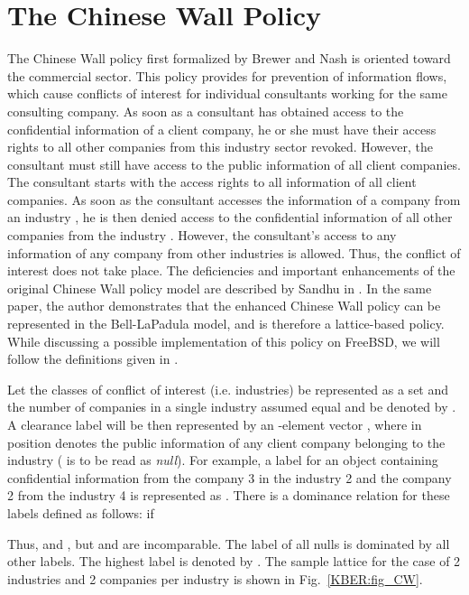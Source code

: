 \documentclass[10pt,a4paper,conference,onecolumn]{IEEEtran}
\newcommand{\KBERcode}[1]{\textsl{#1}}
\begin{document}
\section{The Chinese Wall Policy}

The Chinese Wall policy first formalized by Brewer and Nash \cite{DBLP:conf/sp/BrewerN89}
is oriented toward the commercial sector. This policy provides for prevention of
information flows, which cause conflicts of interest for individual consultants
working for the same consulting company. As soon as a consultant has obtained
access to the confidential information of a client company, he or she must 
have their access rights to all other companies from this industry sector 
revoked. However, the consultant must still have access to the public 
information of all client companies. The consultant starts with the access
rights to all information of all client companies. As soon as the consultant
accesses the information of a company  from an industry , he is then
denied access to the confidential information of all other companies from the
industry . However, the consultant's access to any information of any
company from other industries is allowed. Thus, the conflict of interest does not take 
place. The deficiencies and important enhancements of the original Chinese Wall
policy model are described by Sandhu in \cite{DBLP:journals/compsec/Sandhu92}. In the same paper,
the author demonstrates that the enhanced Chinese Wall policy can be 
represented in the Bell-LaPadula model, and is therefore a lattice-based
policy. While discussing a possible implementation of this policy on FreeBSD,
we will follow the definitions given in \cite{DBLP:journals/computer/Sandhu93}.

Let the classes of conflict of interest (i.e. industries) be represented 
as a set  and the number of 
companies in a single industry assumed equal and be denoted by . 
A clearance label will be then represented by an -element vector 
, 
where  in position  denotes the public information of any client company 
belonging to the industry  ( is to be read as \KBERcode{null}). For example, a label for an object containing
confidential information from the company 3 in the industry 2 and the company 2 from 
the industry 4 is represented as .
There is a dominance relation for these labels defined as follows:
 if

Thus,  and ,
but  and  are incomparable. 
The label of all nulls  is dominated by all other labels.
The highest label is denoted by . The sample lattice for the case of 2 industries and 2 companies 
per industry is shown in Fig.~\ref{KBER:fig_CW}.
\end{document}
